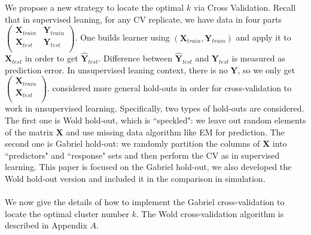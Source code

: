 \documentclass[11pt]{article}
\begin{document}
We propose a new strategy to locate the optimal $k$ via Cross Validation. Recall that in supervised leaning, for any CV replicate, we have data in four parts
 $\begin{pmatrix}
  \mathbf{X}_{train} & \mathbf{Y}_{train}\\
  \mathbf{X}_{test}  & \mathbf{Y}_{test}\\
  \end{pmatrix}$.
One builds learner using $\left(\mathbf{X}_{train}, \mathbf{Y}_{train}\right)$ and apply it to $ \mathbf{X}_{test}$ in order to get $\hat{\mathbf{Y}}_{test}$. Difference between $\hat{\mathbf{Y}}_{test}$ and $\mathbf{Y}_{test}$ is measured as prediction error. In unsupervised leaning context, there is no $\mathbf{Y}$, so we only get $\begin{pmatrix}
  \mathbf{X}_{train}\\
  \mathbf{X}_{test}\\
  \end{pmatrix}$. \cite{perry2009cross} considered more general hold-outs in order for cross-validation to work in unsupervised learning. Specifically, two types of hold-outs are considered. The first one is Wold hold-out, which is ``speckled": we leave out random elements of the matrix $\mathbf{X}$ and use missing data algorithm like EM for prediction. The second one is Gabriel hold-out: we randomly partition the columns of $\mathbf{X}$ into ``predictors" and ``response" sets and then perform the CV as in supervised learning. This paper is focused on the Gabriel hold-out, we also developed the Wold hold-out version and included it in the comparison in simulation.  \\\\
We now give the details of how to implement the Gabriel cross-validation to locate the optimal cluster number $k$. The Wold cross-validation algorithm is described in Appendix $A$.
\end{document}
